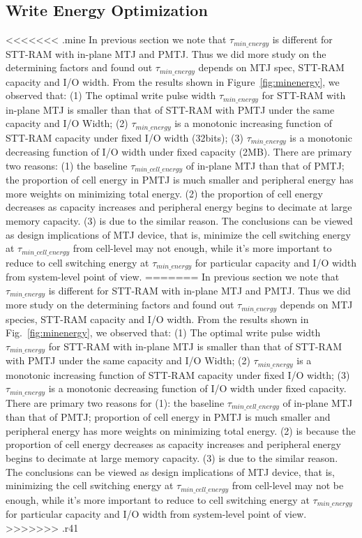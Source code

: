 \subsection{Write Energy Optimization}
<<<<<<< .mine
In previous section we note that $\tau_{min\_energy}$ is different for STT-RAM with in-plane MTJ and PMTJ. Thus we did more study on the determining factors and found out $\tau_{min\_energy}$ depends on MTJ spec, STT-RAM capacity and I/O width. From the results shown in Figure~\ref{fig:minenergy}, we observed that: (1) The optimal write pulse width $\tau_{min\_energy}$ for STT-RAM with in-plane MTJ is smaller than that of STT-RAM with PMTJ under the same capacity and I/O Width; (2) $\tau_{min\_energy}$ is a monotonic increasing function of STT-RAM capacity under fixed I/O width (32bits); (3) $\tau_{min\_energy}$ is a monotonic decreasing function of I/O width under fixed capacity (2MB). There are primary two reasons: (1) the baseline $\tau_{min\_cell\_energy}$ of in-plane MTJ than that of PMTJ; the proportion of cell energy in PMTJ is much smaller and peripheral energy has more weights on minimizing total energy. (2) the proportion of cell energy decreases as capacity increases and peripheral energy begins to decimate at large memory capacity. (3) is due to the similar reason. The conclusions can be viewed as design implications of MTJ device, that is, minimize the cell switching energy at $\tau_{min\_cell\_energy}$ from cell-level may not enough, while it's more important to reduce to cell switching energy at $\tau_{min\_energy}$ for particular capacity and I/O width from system-level point of view.
=======
In previous section we note that $\tau_{min\_energy}$ is different for STT-RAM with in-plane MTJ and PMTJ. Thus we did more study on the determining factors and found out $\tau_{min\_energy}$ depends on MTJ species, STT-RAM capacity and I/O width. From the results shown in Fig.~\ref{fig:minenergy}, we observed that: (1) The optimal write pulse width $\tau_{min\_energy}$ for STT-RAM with in-plane MTJ is smaller than that of STT-RAM with PMTJ under the same capacity and I/O Width; (2) $\tau_{min\_energy}$ is a monotonic increasing function of STT-RAM capacity under fixed I/O width; (3) $\tau_{min\_energy}$ is a monotonic decreasing function of I/O width under fixed capacity. There are primary two reasons for (1): the baseline $\tau_{min\_cell\_energy}$ of in-plane MTJ than that of PMTJ; proportion of cell energy in PMTJ is much smaller and peripheral energy has more weights on minimizing total energy. (2) is because the proportion of cell energy decreases as capacity increases and peripheral energy begins to decimate at large memory capacity. (3) is due to the similar reason. The conclusions can be viewed as design implications of MTJ device, that is, minimizing the cell switching energy at $\tau_{min\_cell\_energy}$ from cell-level may not be enough, while it's more important to reduce to cell switching energy at $\tau_{min\_energy}$ for particular capacity and I/O width from system-level point of view.
>>>>>>> .r41

